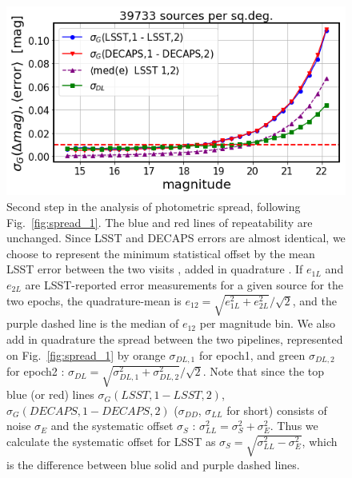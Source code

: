 \documentclass[DM,lsstdraft,toc,usenatbib]{lsstdoc}
\begin{document}
\begin{figure}
\begin{centering}
\includegraphics[width=0.8\columnwidth]{figs/photometric_spread_2_525846-530012.png}
\caption{Second step in the analysis of  photometric spread, following Fig.~\ref{fig:spread_1}. The blue and red lines of repeatability are unchanged.  Since LSST and DECAPS errors are almost identical, we choose to represent the minimum statistical offset by the mean LSST error between the two visits , added in quadrature . If $e_{1L}$ and $e_{2L}$ are LSST-reported error measurements for a given source for the two epochs,  the quadrature-mean is  $e_{12} = \sqrt{e_{1L}^{2} + e_{2L}^{2}} / \sqrt{2}$, and the purple dashed line is the median of $e_{12}$ per magnitude bin.    We also add in quadrature the spread between the two pipelines, represented  on Fig.~\ref{fig:spread_1} by orange $\sigma_{DL,1}$ for epoch1, and green $\sigma_{DL,2}$ for epoch2 : $\sigma_{DL} = \sqrt{\sigma_{DL,1}^{2} + \sigma_{DL,2}^{2}} / \sqrt{2}$.  Note that since the top blue (or red) lines $\sigma_{G}(LSST,1 - LSST,2)$, $\sigma_{G}(DECAPS,1 - DECAPS,2)$   ($\sigma_{DD}$, $\sigma_{LL}$ for short) consists of noise $\sigma_{E} $ and the systematic offset $\sigma_{S}$ : $\sigma_{LL}^{2} = \sigma_{S}^{2} + \sigma_{E}^{2}$. Thus we calculate the systematic offset for LSST as  $\sigma_{S} = \sqrt{\sigma_{LL}^2  - \sigma_{E}^{2}}$, which is the difference between  blue solid and purple dashed lines. 
}
\label{fig:spread_2}
\end{centering}
\end{figure} 
\end{document}
